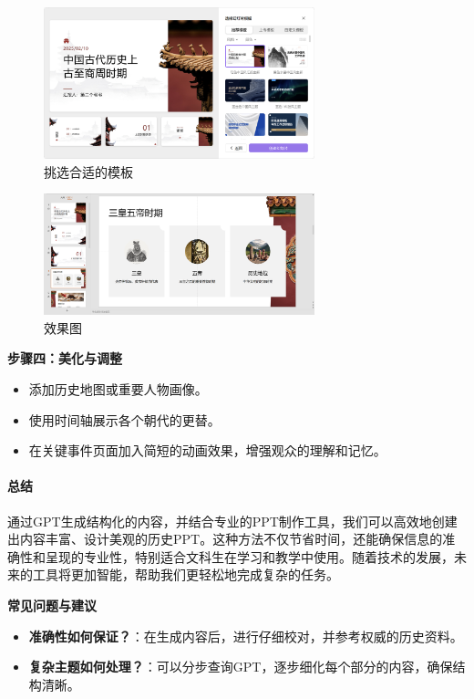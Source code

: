 \centering
\begin{figure}[H] %
    \centering %
    \includegraphics[width=0.7\textwidth]{sections/images/image-20250210192952252.png} %
    \caption{挑选合适的模板} %
    \label{Fig.main1} %
\end{figure}%

\centering
\begin{figure}[H] %
    \centering %
    \includegraphics[width=0.7\textwidth]{sections/images/image-20250210193018631.png} %
    \caption{效果图} %
    \label{Fig.main1} %
\end{figure}%

\textbf{步骤四：美化与调整}

\begin{itemize}

\item
  添加历史地图或重要人物画像。
\item
  使用时间轴展示各个朝代的更替。
\item
  在关键事件页面加入简短的动画效果，增强观众的理解和记忆。
\end{itemize}

\hypertarget{ux603bux7ed3}{%
\paragraph{总结}\label{ux603bux7ed3}}

通过GPT生成结构化的内容，并结合专业的PPT制作工具，我们可以高效地创建出内容丰富、设计美观的历史PPT。这种方法不仅节省时间，还能确保信息的准确性和呈现的专业性，特别适合文科生在学习和教学中使用。随着技术的发展，未来的工具将更加智能，帮助我们更轻松地完成复杂的任务。

\textbf{常见问题与建议}

\begin{itemize}

\item
  \textbf{准确性如何保证？}：在生成内容后，进行仔细校对，并参考权威的历史资料。
\item
  \textbf{复杂主题如何处理？}：可以分步查询GPT，逐步细化每个部分的内容，确保结构清晰。
\end{itemize}

